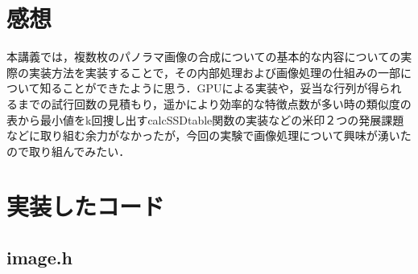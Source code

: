 \documentclass[11pt]{jarticle}
\begin{document}
\section{感想}
本講義では，複数枚のパノラマ画像の合成についての基本的な内容についての実際の実装方法を実装することで，その内部処理および画像処理の仕組みの一部について知ることができたように思う．GPUによる実装や，妥当な行列が得られるまでの試行回数の見積もり，遥かにより効率的な特徴点数が多い時の類似度の表から最小値をk回捜し出すcalcSSDtable関数の実装などの米印２つの発展課題などに取り組む余力がなかったが，今回の実験で画像処理について興味が湧いたので取り組んでみたい．

\section{実装したコード}
\label{sec:code}

\tiny

\subsection{image.h}
\end{document}
